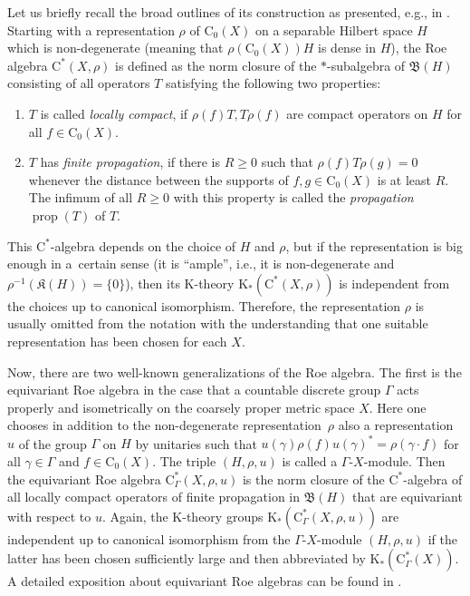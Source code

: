 \documentclass[pdftex]{sigma}
\numberwithin{equation}{section}
\theoremstyle{definition}
\newcommand{\Ct}{\mathrm{C}}
\newcommand{\Cz}{\Ct_0}
\DeclareMathOperator{\Prop}{prop}
\newcommand{\K}{\mathrm{K}}
\newcommand{\textCstar}{\ensuremath{\mathrm{C}^*\!}}
\newcommand{\Roe}{\mathrm{C}^*}
\newcommand{\Kom}{{\mathfrak{K}}}
\newcommand{\Lin}{{\mathfrak{B}}}
\begin{document}
Let us briefly recall the broad outlines of its construction as presented, e.g., in \cite[Section~6.3]{HigRoe}. Starting with a representation $\rho$ of $\Cz(X)$ on a separable Hilbert space $H$ which is non-degenerate (meaning that $\rho(\Cz(X))H$ is dense in $H$), the Roe algebra $\Roe(X,\rho)$ is defined as the norm closure of the $*$-subalgebra of $\Lin(H)$ consisting of all operators $T$ satisfying the following two properties:
\begin{enumerate}\itemsep=0pt
\item[$\bullet$] $T$ is called \emph{locally compact}, if $\rho(f)T,T\rho(f)$ are compact operators on $H$ for all $f\in\Cz(X)$.
\item[$\bullet$] $T$ has \emph{finite propagation}, if there is $R\geq 0$ such that $\rho(f)T\rho(g)=0$ whenever the distance between the supports of $f,g\in\Cz(X)$ is at least $R$. The infimum of all $R\geq 0$ with this property is called the \emph{propagation} $\Prop(T)$ of $T$.
\end{enumerate}
This \textCstar-algebra depends on the choice of $H$ and $\rho$, but if the representation is big enough in a~cer\-tain sense (it is \enquote{ample}, i.e., it is non-degenerate and $\rho^{-1}(\Kom(H))=\{0\}$), then its $\K$-theory $\K_*(\Roe(X,\rho))$ is independent from the choices up to canonical isomorphism.
Therefore, the representation $\rho$ is usually omitted from the notation with the understanding that one suitable representation has been chosen for each $X$.

Now, there are two well-known generalizations of the Roe algebra. The first is the equivariant Roe algebra in the case that a countable discrete group $\Gamma$ acts properly and isometrically on the coarsely proper metric space $X$. Here one chooses in addition to the non-degenerate representation~$\rho$ also a representation $u$ of the group $\Gamma$ on $H$ by unitaries such that $u(\gamma)\rho(f)u(\gamma)^*=\rho(\gamma\cdot f)$ for all $\gamma\in\Gamma$ and $f\in\Cz(X)$. The triple $(H,\rho,u)$ is called a $\Gamma$-$X$-module. Then the equivariant Roe algebra $\Roe_\Gamma(X,\rho,u)$ is the norm closure of the \textCstar-algebra of all locally compact operators of finite propagation in $\Lin(H)$ that are equivariant with respect to $u$. Again, the $\K$-theory groups $\K_*(\Roe_\Gamma(X,\rho,u))$ are independent up to canonical isomorphism from the $\Gamma$-$X$-module $(H,\rho,u)$ if the latter has been chosen sufficiently large and then abbreviated by $\K_*(\Roe_\Gamma(X))$.
A detailed exposition about equivariant Roe algebras can be found in \cite{WillettYuHigherIndexTheory}.
\end{document}
